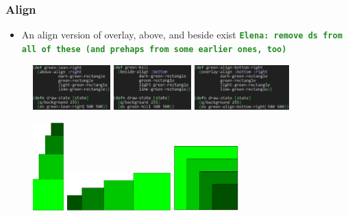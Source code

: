 \documentclass{beamer}
\newcommand{\comment}[1]{{\bf \tt  {#1}}}
\newcommand{\emcomment}[1]{\textcolor{ForestGreen}{\comment{Elena: {#1}}}}
\begin{document}
\begin{frame}
\frametitle{Align}
	\begin{itemize}
		\item An align version of overlay, above, and beside exist \emcomment{remove ds from all of these (and prehaps from some earlier ones, too)}
	\end{itemize}
		\begin{figure}
		\includegraphics[width=3cm]{PresentationImages/greenLeanRightCode.png}
		\hspace{0.25cm}
		\includegraphics[width=3cm]{PresentationImages/greenSlopeBottomCode.png}
		\hspace{0.25cm}
		\includegraphics[width=3.65cm]{PresentationImages/greenAlignBottomRightCode.png}
	\end{figure}

	\begin{figure}
		\includegraphics[width=1.2cm]{PresentationImages/greenLeanRight.png}
		\hspace{1cm} 	\vspace{0.3cm}
		\includegraphics[width=4cm]{PresentationImages/greenSlopeBottom.png}
		\hspace{1cm} 	\vspace{0.3cm}
		\includegraphics[width=2.5cm]{PresentationImages/greenAlignBottomRight.png}
	\end{figure}

\end{frame}
\end{document}
